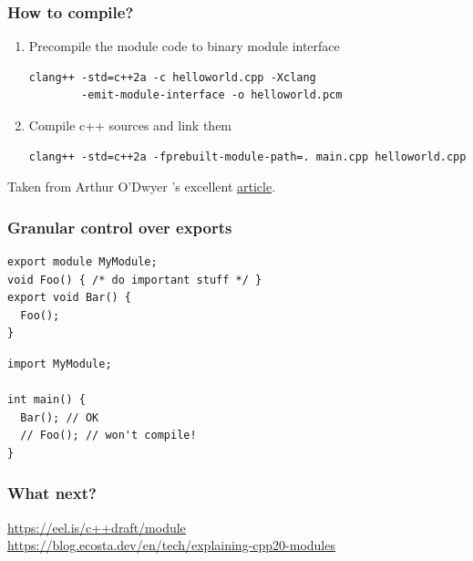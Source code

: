 \documentclass[aspectratio=169]{beamer}
\begin{document}
\begin{frame}[fragile]
\frametitle{How to compile?}
  \begin{enumerate}
    \item{Precompile the module code to binary module interface}
    \begin{verbatim}
clang++ -std=c++2a -c helloworld.cpp -Xclang
        -emit-module-interface -o helloworld.pcm
    \end{verbatim}

    \item{Compile c++ sources and link them}
    \begin{verbatim}
clang++ -std=c++2a -fprebuilt-module-path=. main.cpp helloworld.cpp
    \end{verbatim}
  \end{enumerate}

  {\footnotesize Taken from Arthur O'Dwyer 's excellent
  \href{https://quuxplusone.github.io/blog/2019/11/07/modular-hello-world/}
  {article}.}
\end{frame}


\begin{frame}[fragile]
\frametitle{Granular control over exports}
\begin{verbatim}
export module MyModule;
void Foo() { /* do important stuff */ }
export void Bar() {
  Foo();
}
\end{verbatim}

\begin{verbatim}
import MyModule;

int main() {
  Bar(); // OK
  // Foo(); // won't compile!
}
\end{verbatim}
\end{frame}

\begin{frame}[fragile]
\frametitle{What next?}
{\Large \href{https://eel.is/c++draft/module}{https://eel.is/c++draft/module}}
\\
{\Large \href{https://blog.ecosta.dev/en/tech/explaining-cpp20-modules}
{https://blog.ecosta.dev/en/tech/explaining-cpp20-modules}}
\\
\vspace{2ex}

\end{frame}
\end{document}
